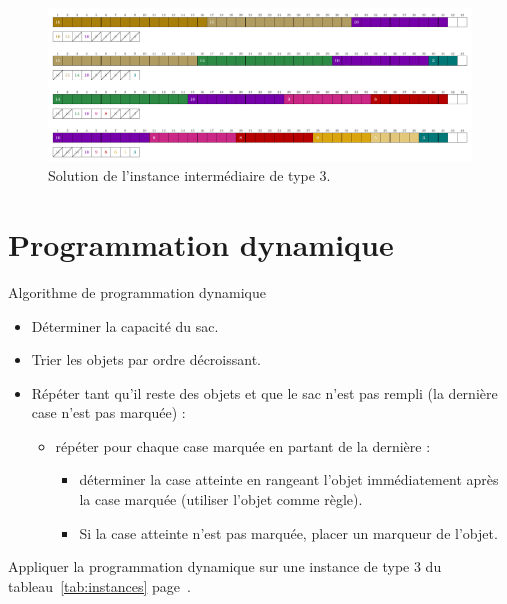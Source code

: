 \documentclass[11pt]{article}
\newcommand{\instance}[1]{instance de type #1 du tableau~\ref{tab:instances} page~\pageref{tab:instances}}
\begin{document}
  \begin{figure}[htbp]
    \centering
    \includegraphics[width=0.6\linewidth]{ex3-9-MTGS.pdf}
    \caption{Solution de l'instance intermédiaire de type 3.}
  \end{figure}


  \section{Programmation dynamique}



  \begin{algorithme}{Algorithme de programmation dynamique}
    \begin{itemize}
    \item Déterminer la capacité du sac.
    \item Trier les objets par ordre décroissant.
    \item  Répéter tant qu'il reste des objets et que le sac n'est pas rempli (la dernière case n'est pas marquée) :
      \begin{itemize}
      \item répéter pour chaque case marquée en partant de la dernière :
      \begin{itemize}
      \item déterminer la case atteinte en rangeant l'objet immédiatement après la case marquée (utiliser l'objet comme règle).
      \item Si la case atteinte n'est pas marquée, placer un marqueur de l'objet.
      \end{itemize}
      \end{itemize}
    \end{itemize}
  \end{algorithme}


   \begin{exercice}{}
    \label{ex:ex5}
    Appliquer la programmation dynamique sur une \instance{3}.
  \end{exercice}
\end{document}
